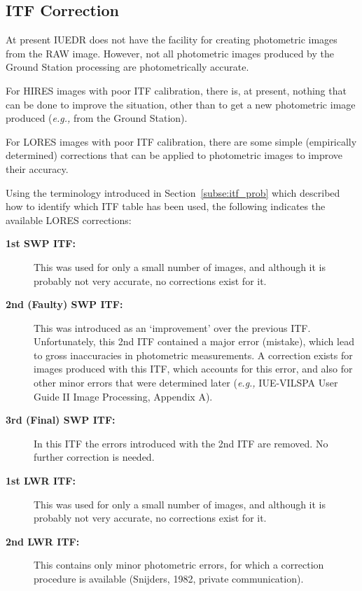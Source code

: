\subsection{ITF Correction}

At present IUEDR does not have the facility for creating photometric images
from the RAW image.  However, not all photometric images produced by
the Ground Station processing are photometrically accurate.

For HIRES images with poor ITF calibration, there is, at present, nothing that
can be done to improve the situation, other than to get a new photometric image
produced ({\it{e.g.,}} from the Ground Station)\@.

For LORES images with poor ITF calibration, there are some simple (empirically
determined) corrections that can be applied to photometric images to
improve their accuracy.

Using the terminology introduced in Section~\ref{subse:itf_prob} which
described how to identify which ITF table has been used, the following
indicates the available LORES corrections:

\begin{description}

\item [{\bf 1st SWP ITF:}]
      This was used for only a small number of images, and
      although it is probably not very accurate, no corrections exist for it.

\item [{\bf 2nd (Faulty) SWP ITF:}]
      This was introduced as an `improvement' over the
      previous ITF\@.  Unfortunately, this 2nd ITF contained a major error
      (mistake), which lead to gross inaccuracies in photometric measurements.
      A correction exists for images produced with this ITF, which accounts for
      this error, and also for other minor errors that were determined later
      ({\it{e.g.,}} IUE-VILSPA User Guide II Image Processing, Appendix A)\@.

\item [{\bf 3rd (Final) SWP ITF:}]
      In this ITF the errors introduced with the 2nd
      ITF are removed.  No further correction is needed.

\item [{\bf 1st LWR ITF:}]
      This was used for only a small number of images, and
      although it is probably not very accurate, no corrections exist for it.

\item [{\bf 2nd LWR ITF:}]
      This contains only minor photometric errors, for
      which a correction procedure is available (Snijders, 1982, private
      communication)\@.

\end{description}

